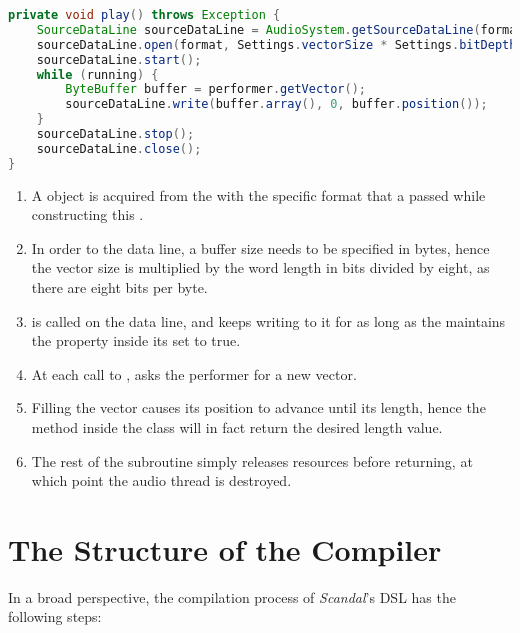 \begin{lstlisting}[language=Java,caption={Writing buffers of audio data inside the \il{play} subroutine.},label={alg:play}]
private void play() throws Exception {
	SourceDataLine sourceDataLine = AudioSystem.getSourceDataLine(format);
	sourceDataLine.open(format, Settings.vectorSize * Settings.bitDepth / 8);
	sourceDataLine.start();
	while (running) {
		ByteBuffer buffer = performer.getVector();
		sourceDataLine.write(buffer.array(), 0, buffer.position());
	}
	sourceDataLine.stop();
	sourceDataLine.close();
}
\end{lstlisting}

\begin{enumerate}
	\addtocounter{enumi}{1}
	\item A  object is acquired from the  with the specific format that a  passed while constructing this .
	\item In order to  the data line, a buffer size needs to be specified in bytes, hence the vector size is multiplied by the word length in bits divided by eight, as there are eight bits per byte.
	\item {} is called on the data line, and  keeps writing to it for as long as the  maintains the  property inside its  set to true.
	\item At each call to ,  asks the performer for a new vector.
	\item Filling the vector causes its position to advance until its length, hence the  method inside the  class will in fact return the desired length value.
	\addtocounter{enumi}{2}
	\item The rest of the  subroutine simply releases resources before returning, at which point the audio thread is destroyed.
\end{enumerate}

\section{The Structure of the Compiler}

In a broad perspective, the compilation process of \emph{Scandal}'s DSL has the following steps:

